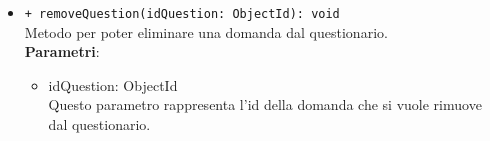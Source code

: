 \begin{itemize}
\begin{itemize}
				\item \texttt{+ removeQuestion(idQuestion: ObjectId): void} \\
				Metodo per poter eliminare una domanda dal questionario.\\
				\textbf{Parametri}:
				\begin{itemize}
					\item {idQuestion: ObjectId}\\
					Questo parametro rappresenta l'id della domanda che si vuole rimuove dal questionario.
				\end{itemize}
				
				
			\end{itemize}
		\end{itemize}	
		
		